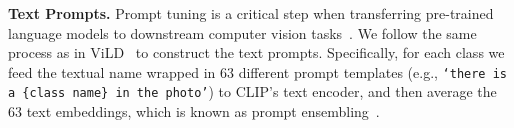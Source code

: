 \documentclass[runningheads]{llncs}
\begin{document}
\noindent \textbf{Text Prompts.}
Prompt tuning is a critical step when transferring pre-trained language models to downstream computer vision tasks~\cite{zhou2022coop,zhou2022cocoop,zhang2022neural}. We follow the same process as in ViLD~\cite{gu2021open} to construct the text prompts. Specifically, for each class we feed the textual name wrapped in 63 different prompt templates (e.g., \texttt{`there is a \{class name\} in the photo'}) to CLIP's text encoder, and then average the 63 text embeddings, which is known as prompt ensembling~\cite{radford2021learning}.
 
\end{document}
